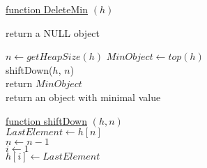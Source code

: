 \documentclass{article}
\begin{document}
\begin{algorithm}
    

    \underline{function DeleteMin} $(h)$\\
        
        {
            return a NULL object\\
        }
    
        $n \leftarrow getHeapSize(h)$ 
        $MinObject \leftarrow top(h)$\\
        shiftDown($h$, $n$)\\
        return $MinObject$\\
    \caption{return an object with minimal value}
    
    \BlankLine
    \BlankLine
    
    \underline{function shiftDown} $(h, n)$\\
    $LastElement \leftarrow h[n]$\\
    $n \leftarrow n - 1$ \\
    $i \leftarrow 1$\\
    
    $h[i] \leftarrow LastElement$\\
\end{algorithm}
\end{document}
